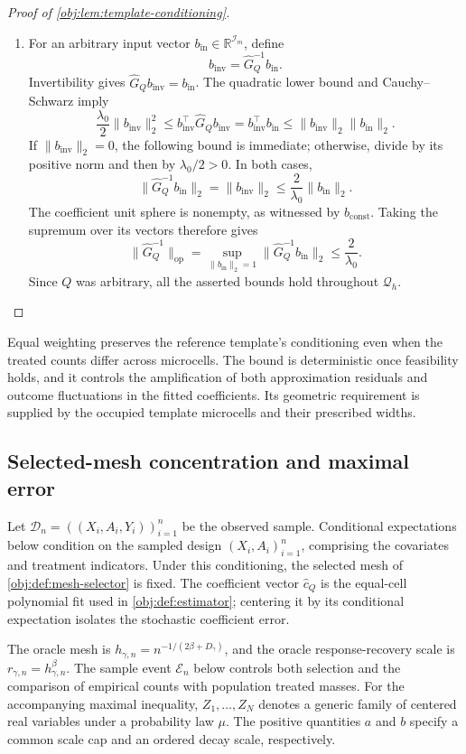 \documentclass[11pt]{article}
\begin{document}
\begin{proof}[Proof of \cref{obj:lem:template-conditioning}]
\begin{enumerate}
\item For an arbitrary input vector \(b_{\mathrm{in}}\in\mathbb R^{\mathcal I_m}\), define
\[
b_{\mathrm{inv}}=\widehat G_Q^{-1}b_{\mathrm{in}}.
\]
Invertibility gives \(\widehat G_Qb_{\mathrm{inv}}=b_{\mathrm{in}}\). The quadratic lower bound and Cauchy--Schwarz imply
\[
\frac{\lambda_0}{2}\|b_{\mathrm{inv}}\|_2^2
\le b_{\mathrm{inv}}^\top\widehat G_Qb_{\mathrm{inv}}
=b_{\mathrm{inv}}^\top b_{\mathrm{in}}
\le\|b_{\mathrm{inv}}\|_2\|b_{\mathrm{in}}\|_2.
\]
If \(\|b_{\mathrm{inv}}\|_2=0\), the following bound is immediate; otherwise, divide by its positive norm and then by \(\lambda_0/2>0\). In both cases,
\[
\|\widehat G_Q^{-1}b_{\mathrm{in}}\|_2
=\|b_{\mathrm{inv}}\|_2
\le\frac2{\lambda_0}\|b_{\mathrm{in}}\|_2.
\]
The coefficient unit sphere is nonempty, as witnessed by \(b_{\mathrm{const}}\). Taking the supremum over its vectors therefore gives
\[
\|\widehat G_Q^{-1}\|_{\mathrm{op}}
=\sup_{\|b_{\mathrm{in}}\|_2=1}
\|\widehat G_Q^{-1}b_{\mathrm{in}}\|_2
\le\frac2{\lambda_0}.
\]
Since \(Q\) was arbitrary, all the asserted bounds hold throughout \(\mathcal Q_h\).
\end{enumerate}
\end{proof}

Equal weighting preserves the reference template's conditioning even when the treated counts differ across microcells. The bound is deterministic once feasibility holds, and it controls the amplification of both approximation residuals and outcome fluctuations in the fitted coefficients. Its geometric requirement is supplied by the occupied template microcells and their prescribed widths.

\subsection{Selected-mesh concentration and maximal error}

Let \(\mathcal D_n=((X_i,A_i,Y_i))_{i=1}^n\) be the observed sample. Conditional expectations below condition on the sampled design \((X_i,A_i)_{i=1}^n\), comprising the covariates and treatment indicators. Under this conditioning, the selected mesh of \cref{obj:def:mesh-selector} is fixed. The coefficient vector \(\widehat c_Q\) is the equal-cell polynomial fit used in \cref{obj:def:estimator}; centering it by its conditional expectation isolates the stochastic coefficient error.

The oracle mesh is \(h_{\gamma,n}=n^{-1/(2\beta+D_\gamma)}\), and the oracle response-recovery scale is \(r_{\gamma,n}=h_{\gamma,n}^{\beta}\). The sample event \(\mathcal E_n\) below controls both selection and the comparison of empirical counts with population treated masses. For the accompanying maximal inequality, \(Z_1,\ldots,Z_N\) denotes a generic family of centered real variables under a probability law \(\mu\). The positive quantities \(a\) and \(b\) specify a common scale cap and an ordered decay scale, respectively.
\end{document}
